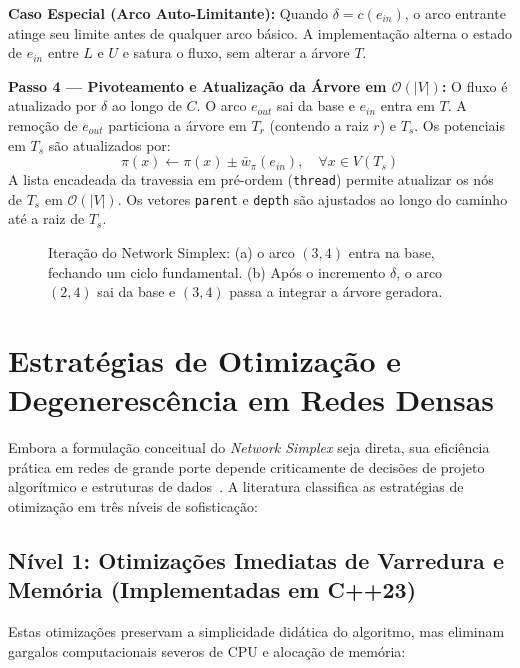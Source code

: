 \textbf{Caso Especial (Arco Auto-Limitante):} Quando $\delta = c(e_{in})$, o arco entrante atinge seu limite antes de qualquer arco básico. A implementação alterna o estado de $e_{in}$ entre $L$ e $U$ e satura o fluxo, sem alterar a árvore $T$.

\textbf{Passo 4 --- Pivoteamento e Atualização da Árvore em $\mathcal{O}(|V|)$:}
O fluxo é atualizado por $\delta$ ao longo de $C$. O arco $e_{out}$ sai da base e $e_{in}$ entra em $T$. A remoção de $e_{out}$ particiona a árvore em $T_r$ (contendo a raiz $r$) e $T_s$. Os potenciais em $T_s$ são atualizados por:
$$\pi(x) \leftarrow \pi(x) \pm \bar{w}_\pi(e_{in}), \quad \forall x \in V(T_s)$$
A lista encadeada da travessia em pré-ordem (\lstinline{thread}) permite atualizar os nós de $T_s$ em $\mathcal{O}(|V|)$. Os vetores \lstinline{parent} e \lstinline{depth} são ajustados ao longo do caminho até a raiz de $T_s$.

\begin{figure}[!ht]
\centering

\caption{Iteração do Network Simplex: (a) o arco $(3,4)$ entra na base, fechando um ciclo fundamental. (b) Após o incremento $\delta$, o arco $(2,4)$ sai da base e $(3,4)$ passa a integrar a árvore geradora.}
\label{fig:simplex_pivoteamento}
\end{figure}

\section{Estratégias de Otimização e Degenerescência em Redes Densas}\label{sec:simplex_otimizacoes}

Embora a formulação conceitual do \textit{Network Simplex} seja direta, sua eficiência prática em redes de grande porte depende criticamente de decisões de projeto algorítmico e estruturas de dados~\cite{ahuja1993network}. A literatura classifica as estratégias de otimização em três níveis de sofisticação:

\subsection{Nível 1: Otimizações Imediatas de Varredura e Memória (Implementadas em C++23)}

Estas otimizações preservam a simplicidade didática do algoritmo, mas eliminam gargalos computacionais severos de CPU e alocação de memória:

